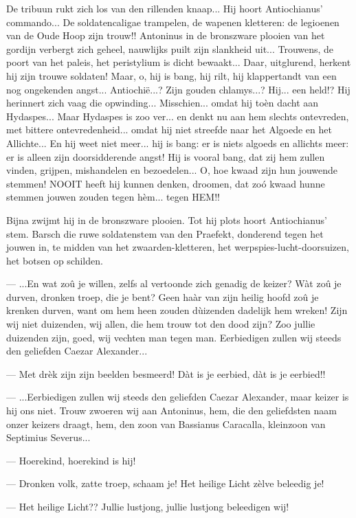 \documentclass[a4paper, 12pt, oneside, dutch]{article}
\begin{document}
De tribuun rukt zich los van den rillenden knaap... Hij hoort Antiochianus' commando... De soldatencaligae trampelen, de wapenen kletteren: de legioenen van de Oude Hoop zijn trouw!! Antoninus in de bronszware plooien van het gordijn verbergt zich geheel, nauwlijks puilt zijn slankheid uit... Trouwens, de poort van het paleis, het peristylium is dicht bewaakt... Daar, uitglurend, herkent hij zijn trouwe soldaten! Maar, o, hij is bang, hij rilt, hij klappertandt van een nog ongekenden angst... Antiochië...? Zijn gouden chlamys...? Hij... een held!? Hij herinnert zich vaag die opwinding... Misschien... omdat hij toèn dacht aan Hydaspes... Maar Hydaspes is zoo ver... en denkt nu aan hem slechts ontevreden, met bittere ontevredenheid... omdat hij niet streefde naar het Algoede en het Allichte... En hij weet niet meer... hij is bang: er is niets algoeds en allichts meer: er is alleen zijn doorsidderende angst! Hij is vooral bang, dat zij hem zullen vinden, grijpen, mishandelen en bezoedelen... O, hoe kwaad zijn hun jouwende stemmen! NOOIT heeft hij kunnen denken, droomen, dat zoó kwaad hunne stemmen jouwen zouden tegen hèm... tegen HEM!!

Bijna zwijmt hij in de bronszware plooien. Tot hij plots hoort Antiochianus' stem. Barsch die ruwe soldatenstem van den Praefekt, donderend tegen het jouwen in, te midden van het zwaarden-kletteren, het werpspies-lucht-doorsuizen, het botsen op schilden.

--- ...En wat zoû je willen, zelfs al vertoonde zich genadig de keizer? Wàt zoû je durven, dronken troep, die je bent? Geen haàr van zijn heilig hoofd zoû je krenken durven, want om hem heen zouden dùizenden dadelijk hem wreken! Zijn wij niet duizenden, wij allen, die hem trouw tot den dood zijn? Zoo jullie duizenden zijn, goed, wij vechten man tegen man. Eerbiedigen zullen wij steeds den geliefden Caezar Alexander...

--- Met drèk zijn zijn beelden besmeerd! Dàt is je eerbied, dàt is je eerbied!!

--- ...Eerbiedigen zullen wij steeds den geliefden Caezar Alexander, maar keizer is hij ons niet. Trouw zwoeren wij aan Antoninus, hem, die den geliefdsten naam onzer keizers draagt, hem, den zoon van Bassianus Caracalla, kleinzoon van Septimius Severus...

--- Hoerekind, hoerekind is hij!

--- Dronken volk, zatte troep, schaam je! Het heilige Licht zèlve beleedig je!

--- Het heilige Licht?? Jullie lustjong, jullie lustjong beleedigen wij!
\end{document}
